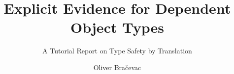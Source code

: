 \documentclass[acmsmall,nonacm,screen]{acmart}
\begin{document}
\title{Explicit Evidence for Dependent Object Types}
\subtitle{A Tutorial Report on Type Safety by Translation}

\author{Oliver Bra\v{c}evac}
\renewcommand{\shortauthors}{Bra\v{c}evac}
\authorsaddresses{}

\begin{abstract}

\end{abstract}

\maketitle

\setcounter{tocdepth}{1}
\tableofcontents


















\end{document}
